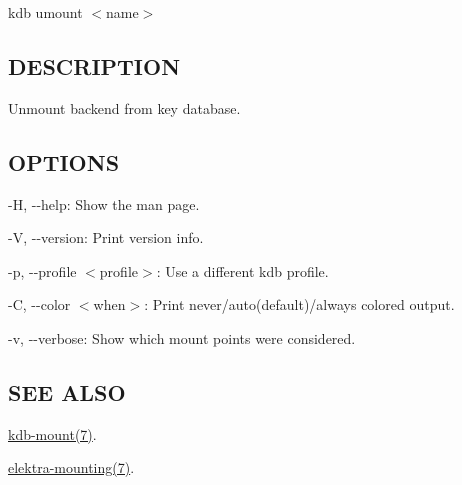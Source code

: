 {\ttfamily kdb umount $<$name$>$}

\subsection*{D\+E\+S\+C\+R\+I\+P\+T\+I\+ON}

Unmount backend from key database.

\subsection*{O\+P\+T\+I\+O\+NS}


\begin{DoxyItemize}
\item {\ttfamily -\/H}, {\ttfamily -\/-\/help}\+: Show the man page.
\item {\ttfamily -\/V}, {\ttfamily -\/-\/version}\+: Print version info.
\item {\ttfamily -\/p}, {\ttfamily -\/-\/profile $<$profile$>$}\+: Use a different kdb profile.
\item {\ttfamily -\/C}, {\ttfamily -\/-\/color $<$when$>$}\+: Print never/auto(default)/always colored output.
\item {\ttfamily -\/v}, {\ttfamily -\/-\/verbose}\+: Show which mount points were considered.
\end{DoxyItemize}

\subsection*{S\+EE A\+L\+SO}


\begin{DoxyItemize}
\item \hyperlink{md_doc_help_kdb-mount_doc_help_kdb-mount_md}{kdb-\/mount(7)}.
\item \hyperlink{md_doc_help_elektra-mounting_doc_help_elektra-mounting_md}{elektra-\/mounting(7)}. 
\end{DoxyItemize}